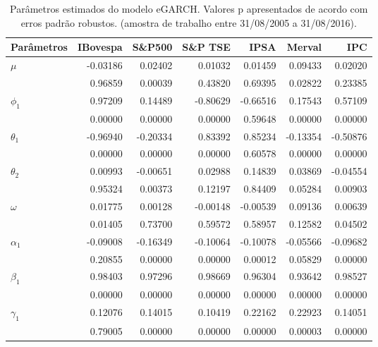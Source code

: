 \begin{table}[H]
\centering
\caption{Par\^ametros estimados do modelo eGARCH. Valores p apresentados 
               de acordo com erros padrão robustos. (amostra de trabalho entre 31/08/2005 a 31/08/2016).} 
\label{tab:garchcoef}
\begin{tabular}{lrrrrrr}
  \hline
Parâmetros & IBovespa & S\&P500 & S\&P TSE & IPSA & Merval & IPC \\ 
  \hline
$\mu$ & -0.03186 & 0.02402 & 0.01032 & 0.01459 & 0.09433 & 0.02020 \\ 
   & 0.96859 & 0.00039 & 0.43820 & 0.69395 & 0.02822 & 0.23385 \\ 
  $\phi_1$ & 0.97209 & 0.14489 & -0.80629 & -0.66516 & 0.17543 & 0.57109 \\ 
   & 0.00000 & 0.00000 & 0.00000 & 0.59648 & 0.00000 & 0.00000 \\ 
  $\theta_1$ & -0.96940 & -0.20334 & 0.83392 & 0.85234 & -0.13354 & -0.50876 \\ 
   & 0.00000 & 0.00000 & 0.00000 & 0.60578 & 0.00000 & 0.00000 \\ 
  $\theta_2$ & 0.00993 & -0.00651 & 0.02988 & 0.14839 & 0.03869 & -0.04554 \\ 
   & 0.95324 & 0.00373 & 0.12197 & 0.84409 & 0.05284 & 0.00903 \\ 
  $\omega$ & 0.01775 & 0.00128 & -0.00148 & -0.00539 & 0.09136 & 0.00639 \\ 
   & 0.01405 & 0.73700 & 0.59572 & 0.58957 & 0.12582 & 0.04502 \\ 
  $\alpha_1$ & -0.09008 & -0.16349 & -0.10064 & -0.10078 & -0.05566 & -0.09682 \\ 
   & 0.20855 & 0.00000 & 0.00000 & 0.00012 & 0.05829 & 0.00000 \\ 
  $\beta_1$ & 0.98403 & 0.97296 & 0.98669 & 0.96304 & 0.93642 & 0.98527 \\ 
   & 0.00000 & 0.00000 & 0.00000 & 0.00000 & 0.00000 & 0.00000 \\ 
  $\gamma_1$ & 0.12076 & 0.14015 & 0.10419 & 0.22162 & 0.22923 & 0.14051 \\ 
   & 0.79005 & 0.00000 & 0.00000 & 0.00000 & 0.00003 & 0.00000 \\ 
   \hline
\end{tabular}
\end{table}
